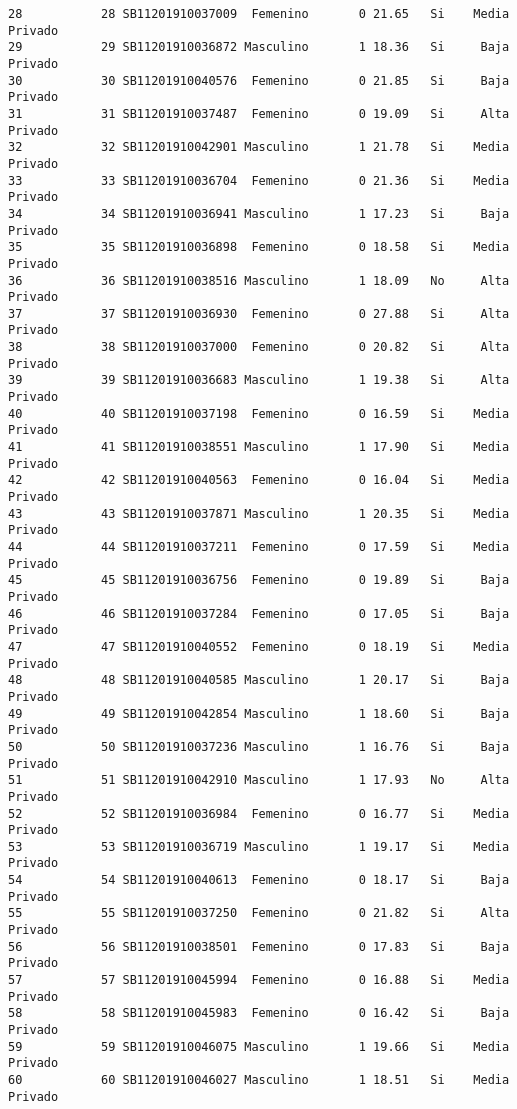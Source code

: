 \documentclass[
  letterpaper,
  DIV=11,
  numbers=noendperiod]{scrartcl}
\begin{document}
\begin{verbatim}
28           28 SB11201910037009  Femenino       0 21.65   Si    Media Privado
29           29 SB11201910036872 Masculino       1 18.36   Si     Baja Privado
30           30 SB11201910040576  Femenino       0 21.85   Si     Baja Privado
31           31 SB11201910037487  Femenino       0 19.09   Si     Alta Privado
32           32 SB11201910042901 Masculino       1 21.78   Si    Media Privado
33           33 SB11201910036704  Femenino       0 21.36   Si    Media Privado
34           34 SB11201910036941 Masculino       1 17.23   Si     Baja Privado
35           35 SB11201910036898  Femenino       0 18.58   Si    Media Privado
36           36 SB11201910038516 Masculino       1 18.09   No     Alta Privado
37           37 SB11201910036930  Femenino       0 27.88   Si     Alta Privado
38           38 SB11201910037000  Femenino       0 20.82   Si     Alta Privado
39           39 SB11201910036683 Masculino       1 19.38   Si     Alta Privado
40           40 SB11201910037198  Femenino       0 16.59   Si    Media Privado
41           41 SB11201910038551 Masculino       1 17.90   Si    Media Privado
42           42 SB11201910040563  Femenino       0 16.04   Si    Media Privado
43           43 SB11201910037871 Masculino       1 20.35   Si    Media Privado
44           44 SB11201910037211  Femenino       0 17.59   Si    Media Privado
45           45 SB11201910036756  Femenino       0 19.89   Si     Baja Privado
46           46 SB11201910037284  Femenino       0 17.05   Si     Baja Privado
47           47 SB11201910040552  Femenino       0 18.19   Si    Media Privado
48           48 SB11201910040585 Masculino       1 20.17   Si     Baja Privado
49           49 SB11201910042854 Masculino       1 18.60   Si     Baja Privado
50           50 SB11201910037236 Masculino       1 16.76   Si     Baja Privado
51           51 SB11201910042910 Masculino       1 17.93   No     Alta Privado
52           52 SB11201910036984  Femenino       0 16.77   Si    Media Privado
53           53 SB11201910036719 Masculino       1 19.17   Si    Media Privado
54           54 SB11201910040613  Femenino       0 18.17   Si     Baja Privado
55           55 SB11201910037250  Femenino       0 21.82   Si     Alta Privado
56           56 SB11201910038501  Femenino       0 17.83   Si     Baja Privado
57           57 SB11201910045994  Femenino       0 16.88   Si    Media Privado
58           58 SB11201910045983  Femenino       0 16.42   Si     Baja Privado
59           59 SB11201910046075 Masculino       1 19.66   Si    Media Privado
60           60 SB11201910046027 Masculino       1 18.51   Si    Media Privado

\end{verbatim}
\end{document}
